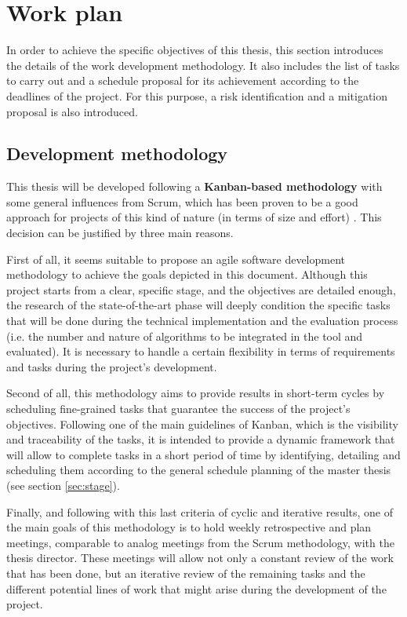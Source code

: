 \documentclass[11pt]{article}
\begin{document}
\section{Work plan}

In order to achieve the specific objectives of this thesis, this section introduces the details of the work development methodology. It also includes the list of tasks to carry out and a schedule proposal for its achievement according to the deadlines of the project. For this purpose, a risk identification and a mitigation proposal is also introduced.

\subsection{Development methodology}

This thesis will be developed following a \textbf{Kanban-based methodology} with some general influences from Scrum, which has been proven to be a good approach for projects of this kind of nature (in terms of size and effort) \cite{kanban}. This decision can be justified by three main reasons.

First of all, it seems suitable to propose an agile software development methodology to achieve the goals depicted in this document. Although this project starts from a clear, specific stage, and the objectives are detailed enough, the research of the state-of-the-art phase will deeply condition the specific tasks that will be done during the technical implementation and the evaluation process (i.e. the number and nature of algorithms to be integrated in the tool and evaluated). It is necessary to handle a certain flexibility in terms of requirements and tasks during the project's development. 

Second of all, this methodology aims to provide results in short-term cycles by scheduling fine-grained tasks that guarantee the success of the project's objectives. Following one of the main guidelines of Kanban, which is the visibility and traceability of the tasks, it is intended to provide a dynamic framework that will allow to complete tasks in a short period of time by identifying, detailing and scheduling them according to the general schedule planning of the master thesis (see section \ref{sec:stage}).

Finally, and following with this last criteria of cyclic and iterative results, one of the main goals of this methodology is to hold weekly retrospective and plan meetings, comparable to analog meetings from the Scrum methodology, with the thesis director. These meetings will allow not only a constant review of the work that has been done, but an iterative review of the remaining tasks and the different potential lines of work that might arise during the development of the project. 
\end{document}
